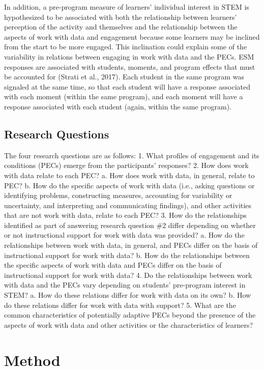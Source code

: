 \documentclass[]{book}
\theoremstyle{definition}
\theoremstyle{definition}
\theoremstyle{definition}
\theoremstyle{remark}
\begin{document}
In addition, a pre-program measure of learners' individual interest in
STEM is hypothesized to be associated with both the relationship between
learners' perception of the activity and themselves and the relationship
between the aspects of work with data and engagement because some
learners may be inclined from the start to be more engaged. This
inclination could explain some of the variability in relations between
engaging in work with data and the PECs. ESM responses are associated
with students, moments, and program effects that must be accounted for
(Strati et al., 2017). Each student in the same program was signaled at
the same time, so that each student will have a response associated with
each moment (within the same program), and each moment will have a
response associated with each student (again, within the same program).

\section{Research Questions}\label{research-questions}

The four research questions are as follows: 1. What profiles of
engagement and its conditions (PECs) emerge from the participants'
responses? 2. How does work with data relate to each PEC? a. How does
work with data, in general, relate to PEC? b. How do the specific
aspects of work with data (i.e., asking questions or identifying
problems, constructing measures, accounting for variability or
uncertainty, and interpreting and communicating findings), and other
activities that are not work with data, relate to each PEC? 3. How do
the relationships identified as part of answering research question \#2
differ depending on whether or not instructional support for work with
data was provided? a. How do the relationships between work with data,
in general, and PECs differ on the basis of instructional support for
work with data? b. How do the relationships between the specific aspects
of work with data and PECs differ on the basis of instructional support
for work with data? 4. Do the relationships between work with data and
the PECs vary depending on students' pre-program interest in STEM? a.
How do these relations differ for work with data on its own? b. How do
these relations differ for work with data with support? 5. What are the
common characteristics of potentially adaptive PECs beyond the presence
of the aspects of work with data and other activities or the
characteristics of learners?

\chapter{Method}\label{method}
\end{document}
